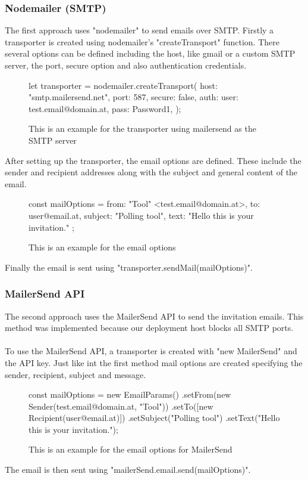 \documentclass[a4paper,12pt]{report}
\begin{document}
\subsubsection{Nodemailer (SMTP)}
The first approach uses "nodemailer" to send emails over SMTP. Firstly a transporter is created using nodemailer's "createTransport" function. There several options can be defined including the host, like gmail or a custom SMTP server, the port, secure option and also authentication credentials. 
\begin{figure}[H]
	\begin{code}
		let transporter = nodemailer.createTransport({
			host: "smtp.mailersend.net",
			port: 587,
			secure: false,
			auth: {
				user: test.email@domain.at,
				pass: Password1,
			}
		});
	\end{code}
	\caption{This is an example for the transporter using mailersend as the SMTP server}
	\label{fig:beispielcode}
\end{figure}
After setting up the transporter, the email options are defined. These include the sender and recipient addresses along with the subject and general content of the email.
\begin{figure}[H]
	\begin{code}
		const mailOptions = {
			from: "Tool" <test.email@domain.at>,
			to: user@email.at,
			subject: "Polling tool",
			text: "Hello this is your invitation."
		};
	\end{code}
	\caption{This is an example for the email options}
	\label{fig:beispielcode1}
\end{figure}
Finally the email is sent using "transporter.sendMail(mailOptions)".
\subsubsection{MailerSend API}
The second approach uses the MailerSend API to send the invitation emails. This method was implemented because our deployment host blocks all SMTP ports.\\\\
To use the MailerSend API, a transporter is created with "new MailerSend" and the API key. Just like int the first method mail options are created specifying the sender, recipient, subject and message.
\begin{figure}[H]
	\begin{code}
		const mailOptions = new EmailParams()
		.setFrom(new Sender(test.email@domain.at, "Tool"))
		.setTo([new Recipient(user@email.at)])
		.setSubject("Polling tool")
		.setText("Hello this is your invitation.");
	\end{code}
	\caption{This is an example for the email options for MailerSend}
	\label{fig:beispielcode2}
\end{figure}
The email is then sent using "mailerSend.email.send(mailOptions)".
\end{document}
